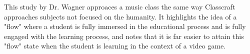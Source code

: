 This study by Dr. Wagner approaces a music class the same way Classcraft approaches subjects not focused on the humanity. It highlights the idea of a "flow" where a student is fully immersed in the educational process and is fully engaged with the learning process, and notes that it is far easier to attain this "flow" state when the student is learning in the context of a video game.